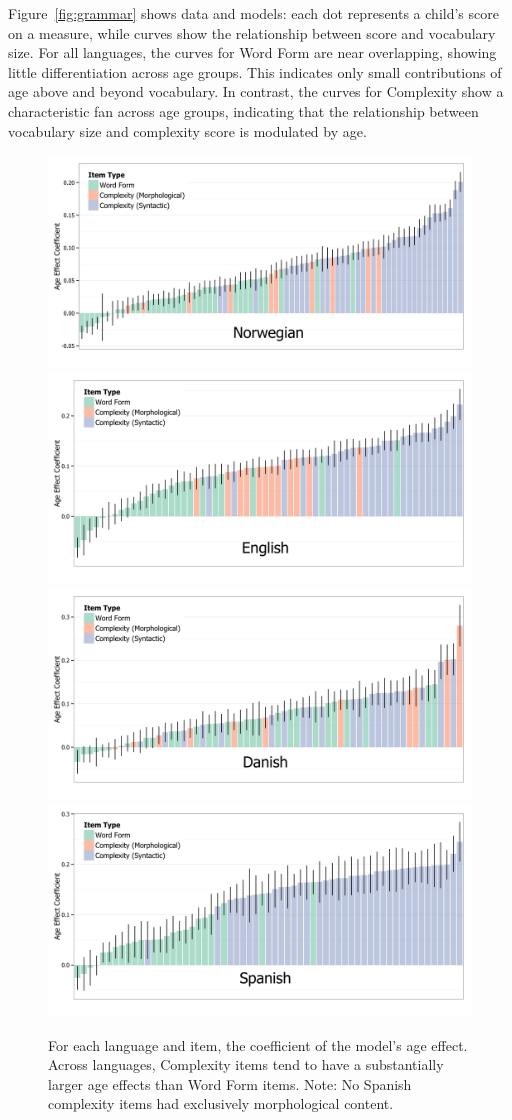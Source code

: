 \documentclass[10pt,letterpaper]{article}
\begin{document}
Figure~\ref{fig:grammar} shows data and models: each dot represents a child's score on a measure, while curves show the relationship between score and vocabulary size.
For all languages, the curves for Word Form are near overlapping, showing little differentiation across age groups. This indicates only small contributions of age above and beyond vocabulary. In contrast, the curves for Complexity show a characteristic fan across age groups, indicating that the relationship between vocabulary size and complexity score is modulated by age. %

\begin{figure}
\centering
\includegraphics[width=.45\textwidth]{plots/norwegian_interactions}
\includegraphics[width=.45\textwidth]{plots/english_interactions}\\
\includegraphics[width=.45\textwidth]{plots/danish_interactions}
\includegraphics[width=.45\textwidth]{plots/spanish_interactions} 
\caption{\label{fig:interactions} For each language and item, the coefficient of the model's age effect. Across languages, Complexity items tend to have a substantially larger age effects than Word Form items. Note: No Spanish complexity items had exclusively morphological content.}
\end{figure}
\end{document}
